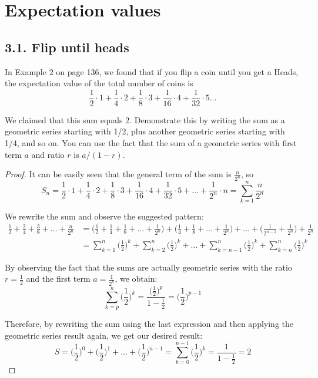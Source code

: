 \chapter{Expectation values}

\section*{3.1. Flip until heads}
In Example 2 on page 136, we found that if you flip a coin until you get a Heads, the
expectation value of the total number of coins is
\begin{equation*}\tag{3.89}
    \frac{1}{2} \cdot 1 + \frac{1}{4} \cdot 2 + 
    \frac{1}{8} \cdot 3 + \frac{1}{16} \cdot 4 + \frac{1}{32} \cdot 5 \ldots 
\end{equation*}

We claimed that this sum equals 2. Demonstrate this by writing the sum as a
geometric series starting with 1/2, plus another geometric series starting
with 1/4, and so on. You can use the fact that the sum of a geometric series
with first term $a$ and ratio $r$ is $a/(1-r)$.

\vspace{1em}

\begin{proof}
    It can be easily seen that the general term of the sum is $\frac{n}{2^n}$, so
    \[
        S_n = \frac{1}{2} \cdot 1 + \frac{1}{4} \cdot 2 + \frac{1}{8} \cdot 3 + \frac{1}{16} \cdot 4 + 
        \frac{1}{32} \cdot 5 + \ldots + \frac{1}{2^n} \cdot n
        = \sum_{k = 1}^{n} \frac{n}{2^n}
    \] 


    We rewrite the sum and observe the suggested pattern:
    \begin{align*}
        \frac{1}{2} + \frac{2}{4} + \frac{3}{8} + \ldots + \frac{n}{2^n} 
        &= \bigg(\frac{1}{2} + \frac{1}{4} + \frac{1}{8} + \ldots + \frac{1}{2^n}\bigg)
            + \bigg(\frac{1}{4} + \frac{1}{8} + \ldots + \frac{1}{2^n}\bigg) + \ldots
            + \bigg(\frac{1}{2^{n - 1}} + \frac{1}{2^n}\bigg) + \frac{1}{2^n} \\
        &= \sum_{k = 1}^{n}\bigg(\frac{1}{2}\bigg)^k + \sum_{k = 2}^{n}\bigg(\frac{1}{2}\bigg)^k + \ldots
            + \sum_{k = n - 1}^{n}\bigg(\frac{1}{2}\bigg)^k + \sum_{k = n}^{n}\bigg(\frac{1}{2}\bigg)^k 
    \end{align*}

    By observing the fact that the sums are actually geometric series with the ratio $r = \frac{1}{2}$
    and the first term $a = \frac{1}{2^k}$, we obtain:
    \[
        \sum_{k = p}^{n} \bigg(\frac{1}{2}\bigg)^k = \frac{\big(\frac{1}{2}\big)^p}{1 - \frac{1}{2}} 
        = \bigg(\frac{1}{2}\bigg)^{p - 1}
    \] 

    Therefore, by rewriting the sum using the last expression and then applying the geometric
    series result again, we get our desired result:
    \[
        S = \bigg(\frac{1}{2}\bigg)^0 + \bigg(\frac{1}{2}\bigg)^1 + \ldots + \bigg(\frac{1}{2}\bigg)^{n - 1}
        = \sum_{k = 0}^{n - 1} \bigg(\frac{1}{2}\bigg)^k 
        = \frac{1}{1 - \frac{1}{2}} = 2
    \] 
\end{proof}

